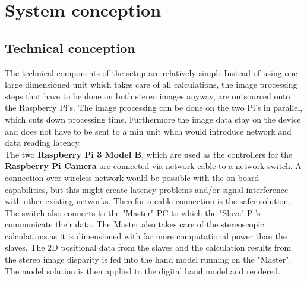 \chapter{System conception}\section{Technical conception}
The technical components of the setup are relatively simple.Instead of using one large dimensioned unit which takes care of all calculations, the image processing steps that have to be done on both stereo images anyway, are outsourced onto the Raspberry Pi's.
The image processing can be done on the two Pi's in parallel, which cuts down processing time. Furthermore the image data stay on the device and does not have to be sent to a min unit whch would introduce network and data reading latency.\\
The two \textbf{Raspberry Pi 3 Model B}, which are used as the controllers for the \textbf{Raspberry Pi Camera} are connected via network cable to a network switch. A connection over wireless network would be possible with the on-board capabilities, but this might create latency problems and/or signal interference with other existing networks. Therefor a cable connection is the safer solution.
The switch also connects to the "Master" PC to which the "Slave" Pi's communicate their data. The Master also takes care of the stereoscopic calculations,as it is dimensioned with far more computational power than the slaves. The 2D positional data from the slaves and the calculation results from the stereo image disparity is fed into the hand model running on the "Master". The model solution is then applied to the digital hand model and rendered.
